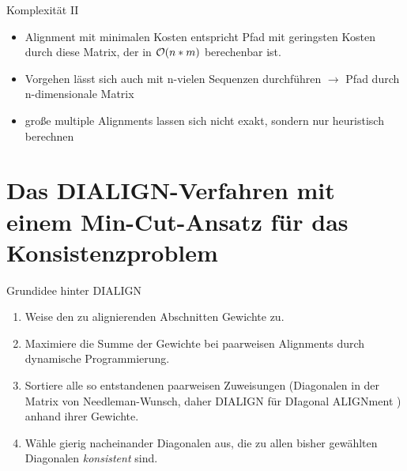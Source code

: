 \documentclass[wide,xcolor={x11names},hyperref={colorlinks=false},pantone312]{beamer}
\begin{document}
\begin{frame}[t, fragile]{Komplexität II}
	\small
	\footnotesize
	\begin{itemize}			
		\item Alignment mit minimalen Kosten entspricht Pfad mit geringsten Kosten durch diese Matrix, der in $\mathcal{O}(n*m)$ berechenbar ist.
		\item Vorgehen lässt sich auch mit n-vielen Sequenzen durchführen $\rightarrow$ Pfad durch n-dimensionale Matrix \pause
		\item große multiple Alignments lassen sich nicht exakt, sondern nur heuristisch berechnen
	\end{itemize}
	\normalsize
\end{frame}

\section{Das DIALIGN-Verfahren mit einem Min-Cut-Ansatz für das Konsistenzproblem}

\begin{frame}[t]{Grundidee hinter DIALIGN}
	\begin{enumerate}
		\item Weise den zu alignierenden Abschnitten Gewichte zu. \pause
		\item Maximiere die Summe der Gewichte bei paarweisen Alignments durch dynamische Programmierung. \pause
		\item Sortiere alle so entstandenen paarweisen Zuweisungen (Diagonalen in der Matrix von Needleman-Wunsch, daher DIALIGN für \glqq DIagonal ALIGNment \grqq) anhand ihrer Gewichte. \pause
		\item Wähle gierig nacheinander Diagonalen aus, die zu allen bisher gewählten Diagonalen \emph{konsistent} sind. \cite{MDW96}
	\end{enumerate}
\end{frame}
\end{document}
